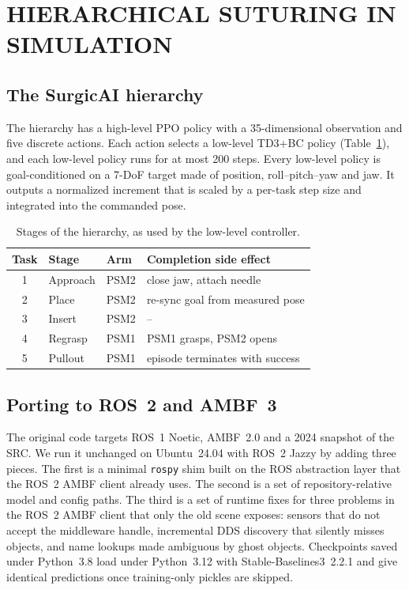 \documentclass[letterpaper, 10 pt, conference]{ieeeconf}  %
\begin{document}
\section{HIERARCHICAL SUTURING IN SIMULATION}
\label{sec:hier}

\subsection{The SurgicAI hierarchy}
The hierarchy has a high-level PPO policy with a 35-dimensional observation and
five discrete actions. Each action selects a low-level TD3+BC policy
(Table~\ref{tab:stages}), and each low-level policy runs for at most 200 steps.
Every low-level policy is goal-conditioned on a 7-DoF target made of position,
roll--pitch--yaw and jaw. It outputs a normalized increment that is scaled by a
per-task step size and integrated into the commanded pose.

\begin{table}[t]
\caption{Stages of the hierarchy, as used by the low-level controller.}
\label{tab:stages}
\centering\footnotesize
\setlength{\tabcolsep}{3.5pt}
\begin{tabular}{@{}clll@{}}
\toprule
Task & Stage & Arm & Completion side effect \\
\midrule
1 & Approach & PSM2 & close jaw, attach needle \\
2 & Place    & PSM2 & re-sync goal from measured pose \\
3 & Insert   & PSM2 & -- \\
4 & Regrasp  & PSM1 & PSM1 grasps, PSM2 opens \\
5 & Pullout  & PSM1 & episode terminates with success \\
\bottomrule
\end{tabular}
\end{table}

\subsection{Porting to ROS~2 and AMBF~3}
The original code targets ROS~1 Noetic, AMBF~2.0 and a 2024 snapshot of the SRC.
We run it unchanged on Ubuntu~24.04 with ROS~2 Jazzy by adding three pieces.
The first is a minimal \texttt{rospy} shim built on the ROS abstraction layer
that the ROS~2 AMBF client already uses. The second is a set of repository-relative
model and config paths. The third is a set of runtime fixes for three problems
in the ROS~2 AMBF client that only the old scene exposes: sensors that do not
accept the middleware handle, incremental DDS discovery that silently misses
objects, and name lookups made ambiguous by ghost objects. Checkpoints saved
under Python~3.8 load under Python~3.12 with Stable-Baselines3~2.2.1 and give
identical predictions once training-only pickles are skipped.
\end{document}
